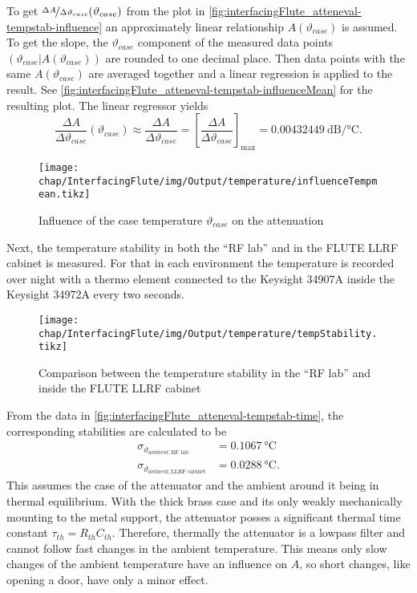 To get $\nicefrac{\Delta A}{\Delta \vartheta_{case}} (\vartheta_{case})$ from the plot in \autoref{fig:interfacingFlute_atteneval-tempstab-influence} an approximately linear relationship $A(\vartheta_{case})$ is assumed. To get the slope, the $\vartheta_{case}$ component of the measured data points $(\vartheta_{case}|A(\vartheta_{case}))$ are rounded to one decimal place. Then data points with the same $A(\vartheta_{case})$ are averaged together and a linear regression is applied to the result. See \autoref{fig:interfacingFlute_atteneval-tempstab-influenceMean} for the resulting plot. The linear regressor yields
\begin{equation}
\frac{\Delta A}{\Delta \vartheta_{case}} (\vartheta_{case})
\approx \frac{\Delta A}{\Delta \vartheta_{case}}
= \left[\frac{\Delta A}{\Delta \vartheta_{case}}\right]_\text{max}
= \SI{0.00432449}{\dB\per\celsius}.
\end{equation}

\begin{figure}[tb]
	\centering
	\texttt{[image: chap/InterfacingFlute/img/Output/temperature/influenceTempmean.tikz]}
	\caption{Influence of the case temperature $\vartheta_{case}$ on the attenuation}
	\label{fig:interfacingFlute_atteneval-tempstab-influenceMean}
\end{figure}

Next, the temperature stability in both the ``RF lab'' and in the FLUTE LLRF cabinet is measured. For that in each environment the temperature is recorded over night with a thermo element connected to the Keysight 34907A inside the Keysight 34972A every two seconds.

\begin{figure}[tb]
	\centering
	\texttt{[image: chap/InterfacingFlute/img/Output/temperature/tempStability.tikz]}
	\caption{Comparison between the temperature stability in the ``RF lab'' and inside the FLUTE LLRF cabinet}
	\label{fig:interfacingFlute_atteneval-tempstab-time}
\end{figure}

From the data in \autoref{fig:interfacingFlute_atteneval-tempstab-time}, the corresponding stabilities are calculated to be
\begin{align}
\sigma_{\vartheta_{ambient, \text{RF lab}}}       &= \SI{0.1067}{\celsius}\\
\sigma_{\vartheta_{ambient, \text{LLRF cabinet}}} &= \SI{0.0288}{\celsius}.
\end{align}
This assumes the case of the attenuator and the ambient around it being in thermal equilibrium. With the thick brass case and its only weakly mechanically mounting to the metal support, the attenuator posses a significant thermal time constant $\tau_{th}=R_{th}C_{th}$. Therefore, thermally the attenuator is a lowpass filter and cannot follow fast changes in the ambient temperature.
This means only slow changes of the ambient temperature have an influence on $A$, so short changes, like opening a door, have only a minor effect.

